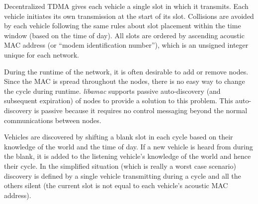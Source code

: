 \documentclass[11pt, letterpaper, oneside]{memoir}
\begin{document}
Decentralized TDMA gives each vehicle a single slot in which it transmits. Each vehicle initiates its own transmission at the start of its slot. Collisions are avoided by each vehicle following the same rules about slot placement within the time window (based on the time of day). All slots are ordered by ascending acoustic MAC address (or ``modem identification number''), which is an unsigned integer unique for each network.

During the runtime of the network, it is often desirable to add or remove nodes. Since the MAC is spread throughout the nodes, there is no easy way to change the cycle during runtime. \textit{libamac} supports passive auto-discovery (and subsequent expiration) of nodes to provide a solution to this problem. This auto-discovery is passive because it requires no control messaging beyond the normal communications between nodes.

Vehicles are discovered by shifting a blank slot in each cycle based on their knowledge of the world and the time of day. If a new vehicle is heard from during the blank, it is added to the listening vehicle's knowledge of the world and hence their cycle. In the simplified situation (which is really a worst case scenario) discovery is defined by a single vehicle transmitting during a cycle and all the others silent (the current slot is not equal to each vehicle's acoustic MAC address).
\end{document}
